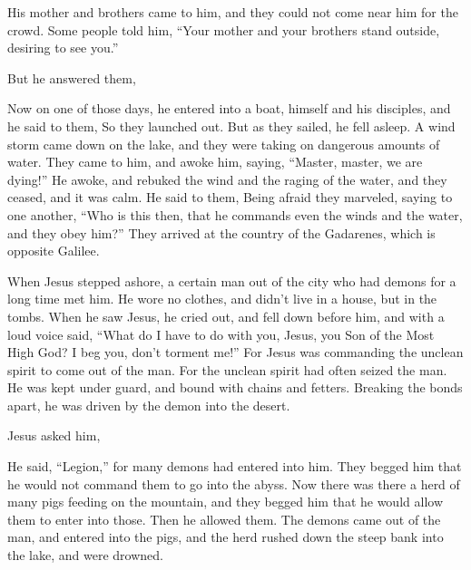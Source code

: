 {{{}}
\par }{\PP {}His mother and brothers came to him, and they could not come near him for the crowd.
Some people told him, “Your mother and your brothers stand outside, desiring to see you.”
\par }{\PP {}But he answered them,
{}
\par }{\PP {}Now on one of those days, he entered into a boat, himself and his disciples, and he said to them,
{} So they launched out.
But as they sailed, he fell asleep. A wind storm came down on the lake, and they were taking on dangerous amounts of water.
They came to him, and awoke him, saying, “Master, master, we are dying!” He awoke, and rebuked the wind and the raging of the water, and they ceased, and it was calm.
He said to them,
{} Being afraid they marveled, saying to one another, “Who is this then, that he commands even the winds and the water, and they obey him?”
They arrived at the country of the Gadarenes, which is opposite Galilee.
\par }{\PP {}When Jesus stepped ashore, a certain man out of the city who had demons for a long time met him. He wore no clothes, and didn’t live in a house, but in the tombs.
When he saw Jesus, he cried out, and fell down before him, and with a loud voice said, “What do I have to do with you, Jesus, you Son of the Most High God? I beg you, don’t torment me!”
For Jesus was commanding the unclean spirit to come out of the man. For the unclean spirit had often seized the man. He was kept under guard, and bound with chains and fetters. Breaking the bonds apart, he was driven by the demon into the desert.
\par }{\PP {}Jesus asked him,
{}
\par }{\PP He said, “Legion,” for many demons had entered into him.
They begged him that he would not command them to go into the abyss.
Now there was there a herd of many pigs feeding on the mountain, and they begged him that he would allow them to enter into those. Then he allowed them.
The demons came out of the man, and entered into the pigs, and the herd rushed down the steep bank into the lake, and were drowned.
}
